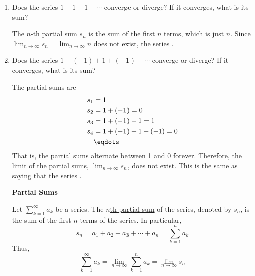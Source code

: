 \documentclass[main]{subfiles}
\begin{document}
  \begin{enumerate}
    \item 
  \begin{problem}[\vfill]
  Does the series $1 + 1 + 1 + \cdots$ converge or diverge?  If it
  converges, what is its sum?
  \end{problem}

  \begin{solution}
  The $n$-th partial sum $s_n$ is the sum of the first $n$ terms, which
  is just $n$.  Since $\displaystyle \lim_{n \to \infty} s_n = \lim_{n
  \to \infty} n$ does not exist, the series .
  \end{solution}

  \item 
  
  \begin{problem}[\vfill]
  Does the series $1 + (-1) + 1 + (-1) + \cdots$ converge or diverge?
  If it converges, what is its sum?
  \end{problem}

  \begin{solution}
  The partial sums are
  \begin{align*}
  s_1 & = 1 \\
  s_2 & = 1 + (-1) = 0 \\
  s_3 & = 1 + (-1) + 1 = 1 \\
  s_4 & = 1 + (-1) + 1 + (-1) = 0 \\
  & \eqdots
  \end{align*}
  That is, the partial sums alternate between 1 and 0 forever.
  Therefore, the limit of the partial sums, $\displaystyle \lim_{n \to
  \infty} s_n$, does not exist.  This is the same as saying that the
  series .
  \end{solution}
\pspace{\newpage}  
  \begin{framed}
\centerline{\textbf{Partial Sums}}
Let $\displaystyle \sum_{k=1}^{\infty} a_k$ be a series. The \uline{$n$th partial sum} of the series, denoted by $s_n$, is the sum of the first $n$ terms of the series. In particular,
$$\boxed{s_n= a_1 + a_2 + a_3 + \cdots + a_n = \sum_{k=1}^n a_k}$$
Thus, $$\boxed{\displaystyle \sum_{k=1}^{\infty} a_k =\lim_{n \to \infty} \sum_{k=1}^n a_k =  \lim_{n \to \infty} s_n}$$
\vspace{0.5cm}


\end{framed}
\end{enumerate}
\end{document}

